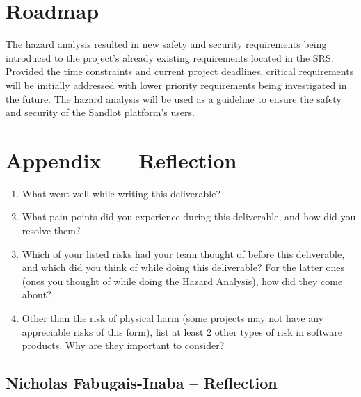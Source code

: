 \documentclass{article}
\begin{document}
\section{Roadmap}


The hazard analysis resulted in new safety and security requirements being
introduced to the project's already existing requirements located in the
SRS. Provided the time constraints and current project deadlines, critical
requirements will be initially addressed with lower priority requirements
being investigated in the future. The hazard analysis will be used as a guideline
to ensure the safety and security of the Sandlot platform's users.

\newpage{}

\section*{Appendix --- Reflection}




\begin{enumerate}
    \item What went well while writing this deliverable? 
    \item What pain points did you experience during this deliverable, and how
    did you resolve them?
    \item Which of your listed risks had your team thought of before this
    deliverable, and which did you think of while doing this deliverable? For
    the latter ones (ones you thought of while doing the Hazard Analysis), how
    did they come about?
    \item Other than the risk of physical harm (some projects may not have any
    appreciable risks of this form), list at least 2 other types of risk in
    software products. Why are they important to consider?
\end{enumerate}

\subsection*{Nicholas Fabugais-Inaba -- Reflection}
\end{document}
